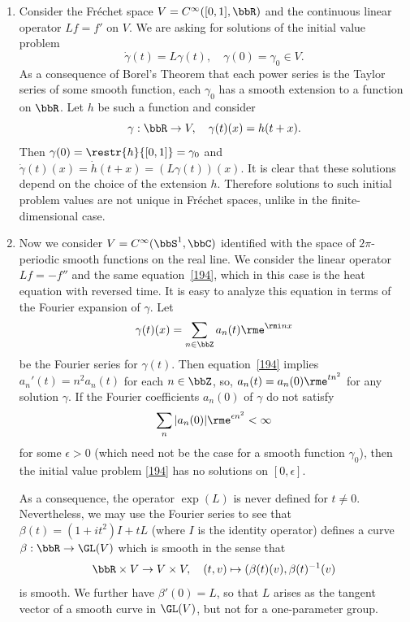 \begin{rem}
    \begin{enumerate}[label=(\alph*)]
        \item Consider the Fr\'echet space $V=C^\infty([0,1],\bbR)$ and the continuous linear operator $Lf=f'$ on $V$. We are asking for solutions of the initial value problem
        \[\dot\gamma(t)=L\gamma(t), \quad \gamma(0)=\gamma_0\in V.\label{194}\]
        As a consequence of Borel's Theorem that each power series is the Taylor series of some smooth function, each $\gamma_0$ has a smooth extension to a function on $\bbR$. Let $h$ be such a function and consider
        \[\gamma:\bbR\to V, \quad \gamma(t)(x)=h(t+x).\]
        Then $\gamma(0)=\restr{h}{[0,1]}=\gamma_0$ and $\dot\gamma(t)(x)=\dot h(t+x)=(L\gamma(t))(x)$. It is clear that these solutions depend on the choice of the extension $h$. Therefore solutions to such initial problem values are not unique in Fr\'echet spaces, unlike in the finite-dimensional case.
        
        \item Now we consider $V=C^\infty(\bbS^1,\bbC)$ identified with the space of $2\pi$-periodic smooth functions on the real line. We consider the linear operator $Lf=-f''$ and the same equation~\eqref{194}, which in this case is the heat equation with reversed time. It is easy to analyze this equation in terms of the Fourier expansion of $\gamma$. Let
        \[\gamma(t)(x)=\sum_{n\in \bbZ} a_n(t)\rme^{\rmi nx}\]
        be the Fourier series for $\gamma(t)$. Then equation~\eqref{194} implies $a_n'(t)=n^2a_n(t)$ for each $n\in\bbZ$, so, $a_n(t)=a_n(0)\rme^{tn^2}$ for any solution $\gamma$. If the Fourier coefficients $a_n(0)$ of $\gamma$ do not satisfy
        \[\sum_n |a_n(0)|\rme^{\epsilon n^2}<\infty\]
        for some $\epsilon>0$ (which need not be the case for a smooth function $\gamma_0$), then the initial value problem \eqref{194} has no solutions on $[0,\epsilon]$.

        As a consequence, the operator $\exp(L)$ is never defined for $t\neq 0$. Nevertheless, we may use the Fourier series to see that $\beta(t)=(1+it^2)I+tL$ (where $I$ is the identity operator) defines a curve $\beta:\bbR\to \GL(V)$ which is smooth in the sense that 
        \[\bbR\times V\to V\times V,\quad (t,v)\mapsto (\beta(t)(v),\beta(t)^{-1}(v)\]
        is smooth. We further have $\beta'(0)=L$, so that $L$ arises as the tangent vector of a smooth curve in $\GL(V)$, but not for a one-parameter group.
    \end{enumerate}
\end{rem}

